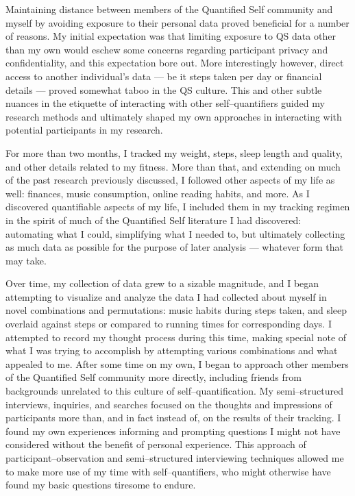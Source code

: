 \documentclass{article}
\begin{document}
Maintaining distance between members of the Quantified Self community and myself by avoiding exposure to their personal data proved beneficial for a number of reasons.
My initial expectation was that limiting exposure to QS data other than my own would eschew some concerns regarding participant privacy and confidentiality,
and this expectation bore out.
More interestingly however,
direct access to another individual's data
--- be it steps taken per day or financial details ---
proved somewhat taboo in the QS culture.
This and other subtle nuances in the etiquette of interacting with other self--quantifiers guided my research methods and ultimately shaped my own approaches in interacting with potential participants in my research.

For more than two months,
I tracked my weight,
steps,
sleep length and quality,
and other details related to my fitness.
More than that,
and extending on much of the past research previously discussed,
I followed other aspects of my life as well:
finances,
music consumption,
online reading habits,
and more.
As I discovered quantifiable aspects of my life,
I included them in my tracking regimen in the spirit of much of the Quantified Self literature I had discovered:
automating what I could,
simplifying what I needed to,
but ultimately collecting as much data as possible for the purpose of later analysis
--- whatever form that may take.

Over time,
my collection of data grew to a sizable magnitude,
and I began attempting to visualize and analyze the data I had collected about myself in novel combinations and permutations:
music habits during steps taken,
and sleep overlaid against steps or compared to running times for corresponding days.
I attempted to record my thought process during this time,
making special note of what I was trying to accomplish by attempting various combinations and what appealed to me.
After some time on my own,
I began to approach other members of the Quantified Self community more directly,
including friends from backgrounds unrelated to this culture of self--quantification.
My semi--structured interviews,
inquiries,
and searches focused on the thoughts and impressions of participants more than,
and in fact instead of,
on the results of their tracking.
I found my own experiences informing and prompting questions I might not have considered without the benefit of personal experience.
This approach of participant--observation and semi--structured interviewing techniques allowed me to make more use of my time with self--quantifiers,
who might otherwise have found my basic questions tiresome to endure.
\end{document}
